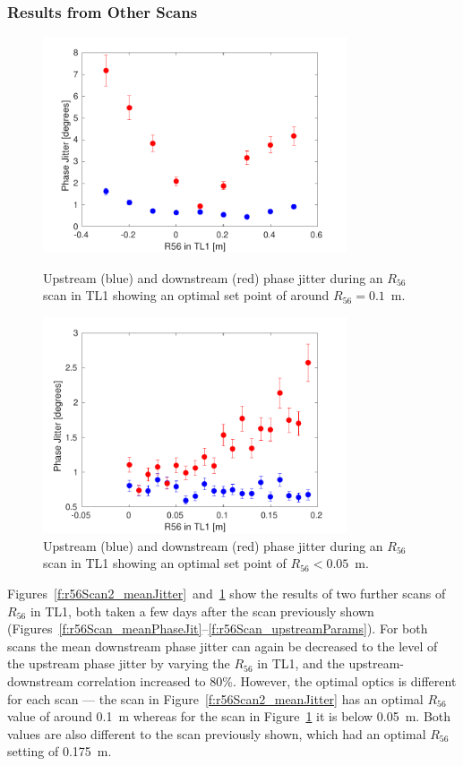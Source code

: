 \subsubsection{Results from Other Scans}

\begin{figure}
  \centering
  \includegraphics[width=0.8\textwidth]{Figures/propagation/r56Scan2_meanJitter}
  \caption{Upstream (blue) and downstream (red) phase jitter during an \(R_{56}\) scan in TL1 showing an optimal set point of around \(R_{56}=0.1\)~m.}
  \label{f:r56Scan2_meanJitter}
  \includegraphics[width=0.8\textwidth]{Figures/propagation/r56Scan3_meanJitter}
  \caption{Upstream (blue) and downstream (red) phase jitter during an \(R_{56}\) scan in TL1 showing an optimal set point of \(R_{56}<0.05\)~m.}
  \label{f:r56Scan3_meanJitter}
\end{figure}


Figures~\ref{f:r56Scan2_meanJitter}~and~\ref{f:r56Scan3_meanJitter} show the results of two further scans of \(R_{56}\) in TL1, both taken a few days after the scan previously shown (Figures~\ref{f:r56Scan_meanPhaseJit}--\ref{f:r56Scan_upstreamParams}). For both scans the mean downstream phase jitter can again be decreased to the level of the upstream phase jitter by varying the \(R_{56}\) in TL1, and the upstream-downstream correlation increased to 80\%. However, the optimal optics is different for each scan --- the scan in Figure~\ref{f:r56Scan2_meanJitter} has an optimal \(R_{56}\) value of around 0.1~m whereas for the scan in Figure~\ref{f:r56Scan3_meanJitter} it is below 0.05~m. Both values are also different to the scan previously shown, which had an optimal \(R_{56}\) setting of 0.175~m.


